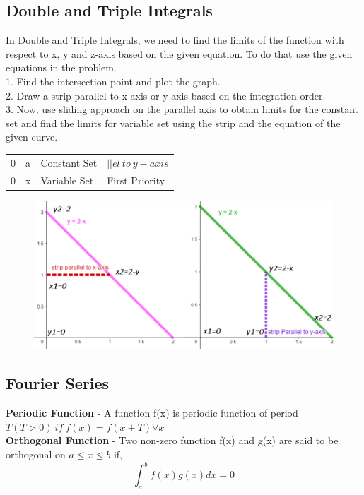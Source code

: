 \subsection{Double and Triple Integrals}
In Double and Triple Integrals, we need to find the limits of the function with respect to x, y and z-axis based on the given equation. To do that use the given equations in the problem.\\
1. Find the intersection point and plot the graph.\\
2. Draw a strip parallel to x-axis or y-axis based on the integration order.\\
3. Now, use sliding approach on the parallel axis to obtain limits for the constant set and find the limits for variable set using the strip and the equation of the given curve.\\
\begin{table}[h!]
\centering
\setlength{\tabcolsep}{1em}
\tabulinesep=1.5mm
\begin{tabu}{llll}
0 & a & Constant Set & \(||el\ to\ y-axis\) \\
0 & x & Variable Set & First Priority
\end{tabu}
\end{table}
\begin{figure}[h!]
    \centering
    \includegraphics[scale=0.6]{images/limit-finder.png}
\end{figure}


\subsection{Fourier Series}
\textbf{Periodic Function} - A function f(x) is periodic function of period \(T(T>0)\ if\ f(x)=f(x+T) \forall x\)\vspace{0.2cm}\\
\textbf{Orthogonal Function} - Two non-zero function f(x) and g(x) are said to be orthogonal on \(a \leq x \leq b\) if,
\[\int_a^bf(x)g(x)dx=0\]

